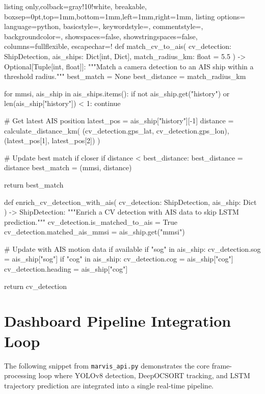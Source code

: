 \begin{tcblisting}{listing only,colback=gray!10!white, breakable, boxsep=0pt,top=1mm,bottom=1mm,left=1mm,right=1mm,
listing options={
language=python,
basicstyle=\small\ttfamily, 
keywordstyle=\color{blue}, 
commentstyle=\color{gray},
backgroundcolor=\color{gray!25},
showspaces=false,
showstringspaces=false,
columns=fullflexible,
escapechar=!}}
def match_cv_to_ais(
    cv_detection: ShipDetection,
    ais_ships: Dict[int, Dict],
    match_radius_km: float = 5.5
) -> Optional[Tuple[int, float]]:
    """Match a camera detection to an AIS ship within a threshold radius."""
    best_match = None
    best_distance = match_radius_km

    for mmsi, ais_ship in ais_ships.items():
        if not ais_ship.get("history") or len(ais_ship["history"]) < 1:
            continue
        
        # Get latest AIS position
        latest_pos = ais_ship["history"][-1]
        distance = calculate_distance_km(
            (cv_detection.gps_lat, cv_detection.gps_lon),
            (latest_pos[1], latest_pos[2])
        )
        
        # Update best match if closer
        if distance < best_distance:
            best_distance = distance
            best_match = (mmsi, distance)
            
    return best_match

def enrich_cv_detection_with_ais(
    cv_detection: ShipDetection, 
    ais_ship: Dict
) -> ShipDetection:
    """Enrich a CV detection with AIS data to skip LSTM prediction."""
    cv_detection.is_matched_to_ais = True
    cv_detection.matched_ais_mmsi = ais_ship.get("mmsi")
    
    # Update with AIS motion data if available
    if "sog" in ais_ship:
        cv_detection.sog = ais_ship["sog"]
    if "cog" in ais_ship: 
        cv_detection.cog = ais_ship["cog"]
        cv_detection.heading = ais_ship["cog"]
        
    return cv_detection
\end{tcblisting}

\section{Dashboard Pipeline Integration Loop}
The following snippet from \texttt{marvis\_api.py} demonstrates the core frame-processing loop where YOLOv8 detection, DeepOCSORT tracking, and LSTM trajectory prediction are integrated into a single real-time pipeline.

